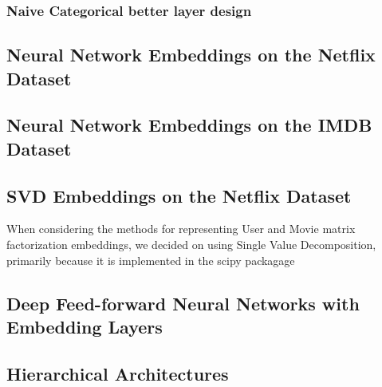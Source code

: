 \subsubsection{Naive Categorical better layer design}
\subsection{Neural Network Embeddings on the Netflix Dataset}
\subsection{Neural Network Embeddings on the IMDB Dataset}
\subsection{SVD Embeddings on the Netflix Dataset}
When considering the methods for representing User and Movie matrix factorization embeddings, we decided on using Single Value Decomposition, primarily because it is implemented in the scipy packagage 
\subsection{Deep Feed-forward Neural Networks with Embedding Layers}
\subsection{Hierarchical Architectures}
